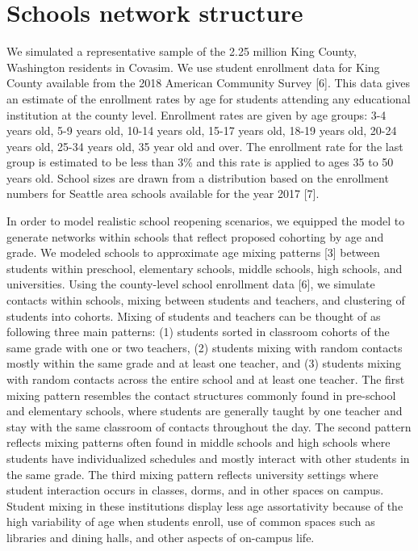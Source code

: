 \documentclass[preprint,12pt]{elsarticle}
\begin{document}
\printbibliography

\appendix

\section{Schools network structure}
\label{sec:AppendixA}

We simulated a representative sample of the 2.25 million King County, Washington residents in Covasim. We use student enrollment data for King County available from the 2018 American Community Survey [6]. This data gives an estimate of the enrollment rates by age for students attending any educational institution at the county level. Enrollment rates are given by age groups: 3-4 years old, 5-9 years old, 10-14 years old, 15-17 years old, 18-19 years old, 20-24 years old, 25-34 years old, 35 year old and over. The enrollment rate for the last group is estimated to be less than 3\%   and this rate is applied to ages 35 to 50 years old. School sizes are drawn from a distribution based on the enrollment numbers for Seattle area schools available for the year 2017 [7].

In order to model realistic school reopening scenarios, we equipped the model to generate networks within schools that reflect proposed cohorting by age and grade. We modeled schools to approximate age mixing patterns [3] between students within preschool, elementary schools, middle schools, high schools, and universities.  Using the county-level school enrollment data [6], we simulate contacts within schools, mixing between students and teachers, and clustering of students into cohorts. Mixing of students and teachers can be thought of as following three main patterns: (1) students sorted in classroom cohorts of the same grade with one or two teachers, (2) students mixing with random contacts mostly within the same grade and at least one teacher, and (3) students mixing with random contacts across the entire school and at least one teacher. The first mixing pattern resembles the contact structures commonly found in pre-school and elementary schools, where students are generally taught by one teacher and stay with the same classroom of contacts throughout the day. The second pattern reflects mixing patterns often found in middle schools and high schools where students have individualized schedules and mostly interact with other students in the same grade. The third mixing pattern reflects university settings where student interaction occurs in classes, dorms, and in other spaces on campus. Student mixing in these institutions display less age assortativity because of the high variability of age when students enroll, use of common spaces such as libraries and dining halls, and other aspects of on-campus life. 
\end{document}
